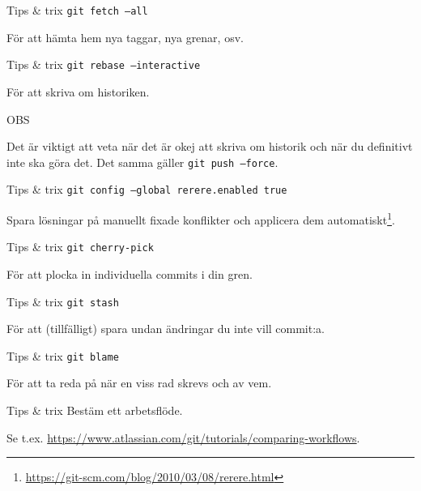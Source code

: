 \documentclass[11pt,xetex]{beamer}
\begin{document}
\begin{frame}{Tips \& trix}
  \Large
  \texttt{git fetch --all}

  \normalsize
  För att hämta hem nya taggar, nya grenar, osv.
\end{frame}

\begin{frame}{Tips \& trix}
  \Large
  \texttt{git rebase --interactive}

  \normalsize
  För att skriva om historiken.

  \vspace{1em}
  \alert{\Large OBS}

  Det är viktigt att veta när det är okej att skriva om historik och när du
  definitivt inte ska göra det. Det samma gäller \texttt{git push
      --force}.
\end{frame}

\begin{frame}{Tips \& trix}
  \Large
  \texttt{git config --global rerere.enabled true}

  Spara lösningar på manuellt fixade konflikter och applicera dem
  automatiskt\footnote{\url{https://git-scm.com/blog/2010/03/08/rerere.html}}.

\end{frame}

\begin{frame}{Tips \& trix}
  \Large
  \texttt{git cherry-pick}

  \normalsize
  För att plocka in individuella commits i din gren.
\end{frame}

\begin{frame}{Tips \& trix}
  \Large
  \texttt{git stash}

  \normalsize
  För att (tillfälligt) spara undan ändringar du inte vill commit:a.
\end{frame}

\begin{frame}{Tips \& trix}
  \Large
  \texttt{git blame}

  \normalsize
  För att ta reda på när en viss rad skrevs och av vem.
\end{frame}

\begin{frame}{Tips \& trix}
  \Large
  Bestäm ett arbetsflöde.

  \normalsize
  Se t.ex. \url{https://www.atlassian.com/git/tutorials/comparing-workflows}.
\end{frame}
\end{document}
